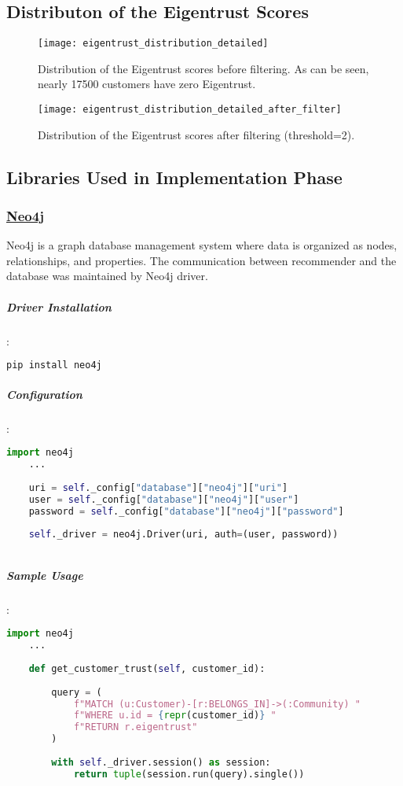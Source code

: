 \subsection{Distributon of the Eigentrust Scores}
	\label{eigentrust_distribution_section}
	\begin{figure}[H]
	\centering
	\texttt{[image: eigentrust\_distribution\_detailed]}
	\caption{Distribution of the Eigentrust scores before filtering. As can be seen, nearly 17500 customers have zero Eigentrust.}
	\label{fig:eigentrust_distribution_figure}
	\end{figure}
	\begin{figure}[H]
	\centering
	\texttt{[image: eigentrust\_distribution\_detailed\_after\_filter]}
	\caption{Distribution of the Eigentrust scores after filtering (threshold=2).}
	\label{fig:eigentrust_distribution_figure_after_filtering}
\end{figure}
\subsection{Libraries Used in Implementation Phase}
	\subsubsection{\href{https://neo4j.com/}{Neo4j}}
	Neo4j is a graph database management system where data is organized as nodes, relationships, and properties. The communication between recommender and the database was maintained by Neo4j driver.
	\subparagraph{Driver Installation}:
	\begin{lstlisting}[language=bash]
	pip install neo4j
	\end{lstlisting}
	
	\subparagraph{Configuration}:
	\begin{lstlisting}[language=python]
	import neo4j
	...
	
	uri = self._config["database"]["neo4j"]["uri"]
	user = self._config["database"]["neo4j"]["user"]
	password = self._config["database"]["neo4j"]["password"]
	
	self._driver = neo4j.Driver(uri, auth=(user, password))
	
	\end{lstlisting}
	
	\subparagraph{Sample Usage}:
	\begin{lstlisting}[language=python, caption=Neo4j driver example]
	import neo4j
	...
	
	def get_customer_trust(self, customer_id):
	
		query = (
			f"MATCH (u:Customer)-[r:BELONGS_IN]->(:Community) "
			f"WHERE u.id = {repr(customer_id)} "
			f"RETURN r.eigentrust"
		)
	
		with self._driver.session() as session:
			return tuple(session.run(query).single())
	
	\end{lstlisting}
	
